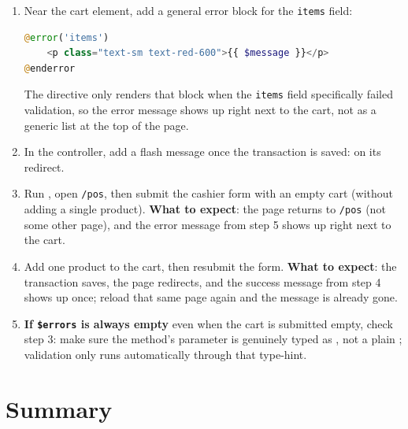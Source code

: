 \begin{enumerate}
\begin{lstlisting}[language=php, title=\lstfile{resources/views/pos/create.blade.php}]
@if (session('success'))
    <div class="bg-green-50 text-green-700 p-3 rounded-md mb-4">
        {{ session('success') }}
    </div>
@endif
    \end{lstlisting}
  \item Near the cart element, add a general error block for the
    \texttt{items} field:
    \begin{lstlisting}[language=php, title=\lstfile{resources/views/pos/create.blade.php}]
@error('items')
    <p class="text-sm text-red-600">{{ $message }}</p>
@enderror
    \end{lstlisting}
    The  directive only renders that block
    when the \texttt{items} field specifically failed validation, so
    the error message shows up right next to the cart, not as a
    generic list at the top of the page.
  \item In the controller, add a flash message once the transaction is
    saved:  on its redirect.
  \item Run , open \texttt{/pos}, then
    submit the cashier form with an empty cart (without adding a
    single product). \textbf{What to expect}: the page returns to
    \texttt{/pos} (not some other page), and the error message from
    step 5 shows up right next to the cart.
  \item Add one product to the cart, then resubmit the form.
    \textbf{What to expect}: the transaction saves, the page redirects,
    and the success message from step 4 shows up once; reload that
    same page again and the message is already gone.
  \item \textbf{If \texttt{\$errors} is always empty} even when the
    cart is submitted empty, check step 3: make sure the 
    method's parameter is genuinely typed as
    , not a plain ;
    validation only runs automatically through that type-hint.
\end{enumerate}


\section{Summary}
\label{sec:validasi-input-rangkuman}

